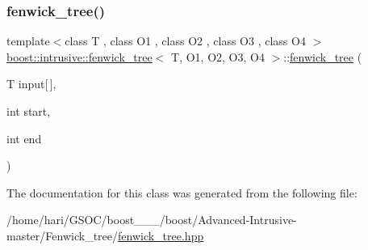\subsubsection{\texorpdfstring{fenwick\+\_\+tree()}{fenwick\_tree()}}
{\footnotesize\ttfamily template$<$class T , class O1 , class O2 , class O3 , class O4 $>$ \\
\hyperlink{classboost_1_1intrusive_1_1fenwick__tree}{boost\+::intrusive\+::fenwick\+\_\+tree}$<$ T, O1, O2, O3, O4 $>$\+::\hyperlink{classboost_1_1intrusive_1_1fenwick__tree}{fenwick\+\_\+tree} (\begin{DoxyParamCaption}\item[{T}]{input\mbox{[}$\,$\mbox{]},  }\item[{int}]{start,  }\item[{int}]{end }\end{DoxyParamCaption})\hspace{0.3cm}{\ttfamily [inline]}}



The documentation for this class was generated from the following file\+:\begin{DoxyCompactItemize}
\item 
/home/hari/\+G\+S\+O\+C/boost\+\_\+\_\+\_/boost/\+Advanced-\/\+Intrusive-\/master/\+Fenwick\+\_\+tree/\hyperlink{fenwick__tree_8hpp}{fenwick\+\_\+tree.\+hpp}\end{DoxyCompactItemize}
